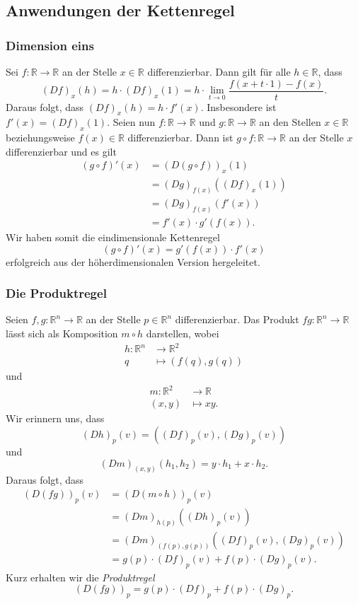 \documentclass[../main.tex]{subfiles}
\begin{document}
\subsection*{Anwendungen der Kettenregel}
\subsubsection*{Dimension eins}
Sei $f \colon \mathbb{R} \to \mathbb{R}$
an der Stelle $x \in \mathbb{R}$ differenzierbar.
Dann gilt für alle $h \in \mathbb{R}$,
dass
\[
  {(Df)}_x(h) = h \cdot {(Df)}_x(1) = h \cdot
  \lim_{t \to 0} \frac{f(x + t \cdot 1) - f(x)}{t}.
\]
Daraus folgt, dass ${(Df)}_x(h) = h \cdot f'(x)$.
Insbesondere ist $f'(x) = {(Df)}_x(1)$.
Seien nun $f \colon \mathbb{R} \to \mathbb{R}$ und
$g \colon \mathbb{R} \to \mathbb{R}$ an den Stellen
$x \in \mathbb{R}$ beziehungsweise
$f(x) \in \mathbb{R}$ differenzierbar.
Dann ist $g \circ f \colon \mathbb{R} \to \mathbb{R}$
an der Stelle $x$ differenzierbar und es gilt
\begin{align*}
   {(g \circ f)}'(x)
   & = {(D(g \circ f ))}_x(1) \\
   &={(Dg)}_{f(x)} ({(Df)}_x(1)) \\
   &  = {(Dg)}_{f(x)}(f'(x)) \\
   &= f'(x) \cdot g'(f(x)).
\end{align*}
Wir haben somit die eindimensionale Kettenregel
\[
  {(g \circ f)}'(x) = g'(f(x)) \cdot f'(x)
\]
erfolgreich aus der höherdimensionalen
Version hergeleitet.

\subsubsection*{Die Produktregel}
Seien $f, g \colon \mathbb{R}^n \to \mathbb{R}$ an der
Stelle $p \in \mathbb{R}^n$ differenzierbar.
Das Produkt $f g \colon \mathbb{R}^n \to \mathbb{R}$
lässt sich als Komposition
$m \circ h$ darstellen, wobei
\begin{align*}
  h \colon \mathbb{R}^n & \to \mathbb{R}^2 \\
  q & \mapsto (f(q), g(q))
\end{align*}
und
\begin{align*}
  m \colon \mathbb{R}^2 & \to \mathbb{R} \\
  (x, y) & \mapsto xy.
\end{align*}
Wir erinnern uns, dass
\[
  {(Dh)}_p(v) = ({(Df)}_p(v), {(Dg)}_p(v))
\]
und
\[
  {(Dm)}_{(x, y)} (h_1, h_2) = y \cdot h_1 + x \cdot h_2.
\]
Daraus folgt, dass
\begin{align*}
  {(D(fg))}_p(v)
  &= {(D(m \circ h))}_p(v) \\
  &= {(Dm)}_{h(p)}({(Dh)}_p(v))\\
  &= {(Dm)}_{(f(p), g(p))} ({(Df)}_p(v), {(Dg)}_p(v)) \\
  &= g(p) \cdot {(Df)}_p(v) + f(p) \cdot {(Dg)}_p(v).
\end{align*}
Kurz erhalten wir die \emph{Produktregel}
\[
  {(D(fg))}_p = g(p) \cdot {(Df)}_p + f(p) \cdot {(Dg)}_p.
\]
\end{document}
